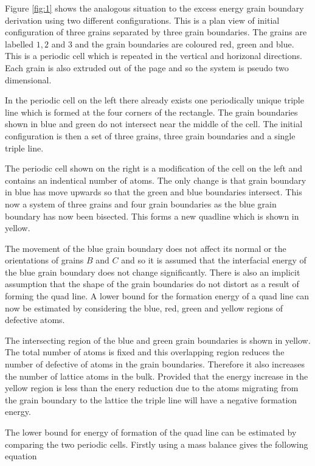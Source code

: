 \documentclass[12pt,a4paper]{book}
\begin{document}
Figure \ref{fig:1}
 shows the analogous situation to the excess energy grain boundary derivation using two different configurations. This is a plan view of initial configuration of three grains separated by three grain boundaries. The grains are labelled $1, 2$ and $3$ and the grain boundaries are coloured red, green and blue. This is a periodic cell which is repeated in the vertical and horizonal directions. Each grain is also extruded out of the page and so the system is pseudo two dimensional.
 
In the periodic cell on the left there already exists one periodically unique triple line which is formed at the four corners of the rectangle. The grain boundaries shown in blue and green do not intersect near the middle of the cell. The initial configuration is then a set of three grains, three grain boundaries and a single triple line.

The periodic cell shown on the right is a modification of the cell on the left and contains an indentical number of atoms. The only change is that grain boundary in blue has move upwards so that the green and blue boundaries intersect. This now a system of three grains and four grain boundaries as the blue grain boundary has now been bisected. This forms a new quadline which is shown in yellow.

The movement of the blue grain boundary does not affect its normal  or the orientations of grains $B$ and $C$ and so it is assumed that the interfacial energy of the blue grain boundary does not change significantly. There is also an implicit assumption that the shape of the grain boundaries do not distort as a result of forming the quad line. A lower bound for the formation energy of a quad line can now be estimated by considering the blue, red, green and yellow regions of defective atoms.

The intersecting region of the blue and green grain boundaries is shown in yellow. The total number of atoms is fixed and this overlapping region reduces the number of defective of atoms in the grain boundaries. Therefore it also increases the number of lattice atoms in the bulk. Provided that the energy increase in the yellow region is less than the enery reduction due to the atoms migrating from the grain boundary to the lattice the triple line will have a negative formation energy. 
 
The lower bound for energy of formation of the quad line can be estimated by comparing the two periodic cells. Firstly using a mass balance gives the following equation
\end{document}
